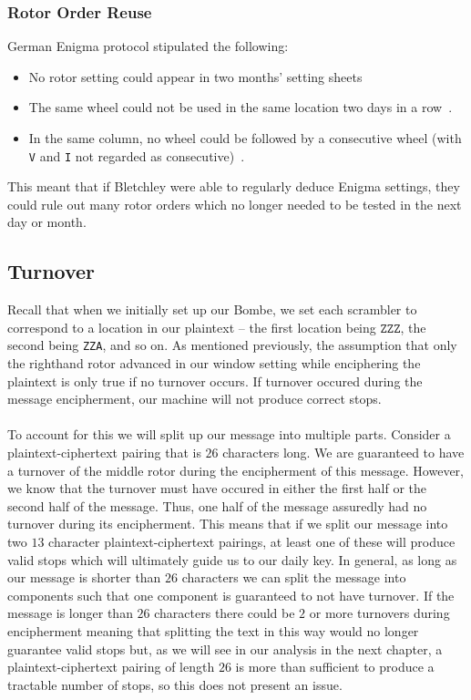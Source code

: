 \subsubsection{Rotor Order Reuse}
German Enigma protocol stipulated the following:
\begin{itemize}
    \item No rotor setting could appear
in two months' setting sheets~\cite{bouch2015enigma}
    \item The same wheel could not be used in the same location two days in a row~\cite{bouch2015enigma}.
    \item In the same column, no wheel could be followed by a consecutive wheel (with \texttt{V} and \texttt{I} not regarded as consecutive)~\cite{bouch2015enigma}.
\end{itemize}
This meant that if Bletchley were able
to regularly deduce Enigma settings, they could rule out many rotor
orders which no longer needed to be tested in the next day or month.

\subsection{Turnover}
Recall that when we initially set up our Bombe, we set each scrambler
to correspond to a location in our plaintext -- the first location
being $\texttt{ZZZ}$, the second being \texttt{ZZA}, and so on. As
mentioned previously, the assumption that only the righthand rotor
advanced in our window setting while enciphering the plaintext is
only true if no turnover occurs. If turnover occured during the
message encipherment, our machine will not produce correct stops.
\\\\To account for this we will split up our message into multiple
parts. Consider a plaintext-ciphertext pairing that is $26$
characters long. We are guaranteed to have a turnover of the middle
rotor during the encipherment of this message. However, we know that
the turnover must have occured in either the first half or the second
half of the message. Thus, one half of the message assuredly had no
turnover during its encipherment. This means that if we split our
message into two $13$ character plaintext-ciphertext pairings, at
least one of these will produce valid stops which will ultimately
guide us to our daily key. In general, as long as our message is
shorter than $26$ characters we can split the message into components
such that one component is guaranteed to not have turnover. If the
message is longer than $26$ characters there could be $2$ or more
turnovers during encipherment meaning that splitting the text in this
way would no longer guarantee valid stops but, as we will see in our
analysis in the next chapter, a plaintext-ciphertext pairing of
length $26$ is more than sufficient to produce a tractable number of
stops, so this does not present an issue.
